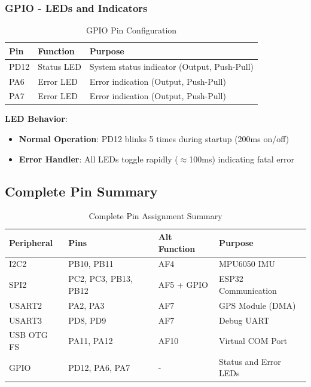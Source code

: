 \documentclass[11pt,a4paper]{article}
\begin{document}
\subsubsection{GPIO - LEDs and Indicators}

\begin{table}[H]
\centering
\begin{tabular}{@{}llp{8cm}@{}}
\toprule
\textbf{Pin} & \textbf{Function} & \textbf{Purpose} \\
\midrule
PD12 & Status LED & System status indicator (Output, Push-Pull) \\
PA6 & Error LED & Error indication (Output, Push-Pull) \\
PA7 & Error LED & Error indication (Output, Push-Pull) \\
\bottomrule
\end{tabular}
\caption{GPIO Pin Configuration}
\end{table}

\textbf{LED Behavior}:
\begin{itemize}
    \item \textbf{Normal Operation}: PD12 blinks 5 times during startup (200ms on/off)
    \item \textbf{Error Handler}: All LEDs toggle rapidly ($\approx$100ms) indicating fatal error
\end{itemize}

\subsection{Complete Pin Summary}

\begin{table}[H]
\centering
\begin{tabular}{@{}lllp{5cm}@{}}
\toprule
\textbf{Peripheral} & \textbf{Pins} & \textbf{Alt Function} & \textbf{Purpose} \\
\midrule
I2C2 & PB10, PB11 & AF4 & MPU6050 IMU \\
SPI2 & PC2, PC3, PB13, PB12 & AF5 + GPIO & ESP32 Communication \\
USART2 & PA2, PA3 & AF7 & GPS Module (DMA) \\
USART3 & PD8, PD9 & AF7 & Debug UART \\
USB OTG FS & PA11, PA12 & AF10 & Virtual COM Port \\
GPIO & PD12, PA6, PA7 & - & Status and Error LEDs \\
\bottomrule
\end{tabular}
\caption{Complete Pin Assignment Summary}
\end{table}
\end{document}
